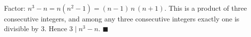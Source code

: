 Factor: $n^3-n=n(n^2-1)=(n-1)\,n\,(n+1)$. This is a product of three consecutive integers, and among any three consecutive integers exactly one is divisible by $3$. Hence $3\mid n^3-n$. $\blacksquare$
